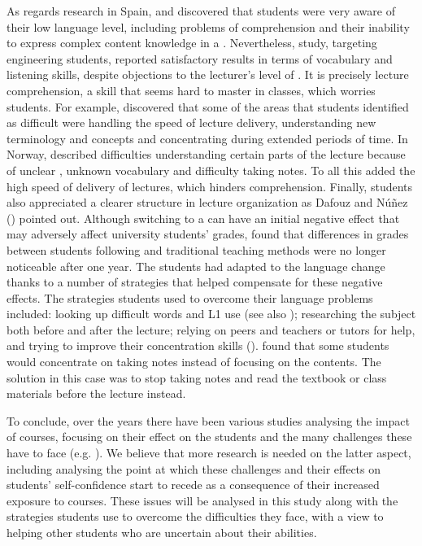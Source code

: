 \documentclass[output=paper]{langsci/langscibook}
\begin{document}
As regards  research in Spain, \citet{Arnó-MaciàMancho-Barés2015} and \citet{Breeze2014} discovered that   students were very aware of their low language  level, including problems of comprehension and their inability to express complex content knowledge in a  \citep{Muñoz2001,FeixasEtAl2009}. Nevertheless,  study,  targeting engineering students, reported  satisfactory results in terms of vocabulary  and listening skills, despite objections to the lecturer’s level of . It is precisely lecture comprehension, a skill that seems hard to master in  classes, which worries students. For example,    \citet{FlowerdewMiller1992} discovered that some of the areas that students identified as difficult were handling the speed of lecture delivery, understanding new terminology and concepts and concentrating during extended periods of time. In Norway, \citet{Hellekjaer2010} described difficulties understanding certain parts of the lecture because of unclear , unknown vocabulary and difficulty taking notes. To all this \citet{Breeze2014} added the high speed of delivery of lectures, which hinders comprehension. Finally, students also appreciated a clearer structure in lecture organization as Dafouz and Núñez (\citeyear{DafouzNúñez2010}) pointed out. Although switching to a  can have an initial negative effect that may adversely affect university students’ grades, \citet{Klaassen2001} found that differences in grades between students following  and traditional teaching methods were no longer noticeable after one year.  The students had adapted to the language change thanks to a number of strategies that helped compensate for these negative effects. The strategies students used to overcome their language problems included: looking up difficult words and L1 use (see also \citealt{Coonan2007}); researching the subject both before and after the lecture; relying on peers and teachers or tutors for help, and trying to improve their concentration skills (\citealt{FlowerdewMiller1992}).   \citet{AireyLinder2007} found that some students would concentrate on taking notes instead of focusing on the contents. The solution in this case was to stop taking notes and read the textbook or class materials before the lecture instead. 



To conclude, over the years there have been various studies analysing the impact of   courses, focusing on their effect on the students and the  many challenges these have to face (e.g. \citealt{Arnó-MaciàMancho-Barés2015,AguilarMuñoz2014}). We believe that more research is needed on the latter aspect, including analysing the point at which these challenges and their effects on students’  self-confidence start to recede as a consequence of their increased exposure to  courses. These issues will be analysed in this study along with the strategies students use to overcome the difficulties they face, with a view to helping other students who are uncertain about their  abilities.
\end{document}
